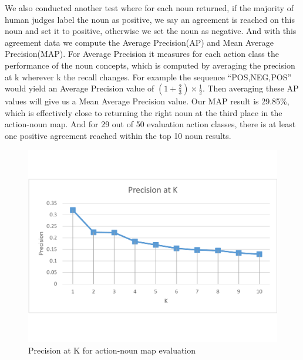 We also conducted another test where for each noun returned, if the majority of human judges label the noun
as positive, we say an agreement is reached on this noun and set it to positive, otherwise we set the noun as negative.
And with this agreement data we compute the Average Precision(AP) and Mean Average Precision(MAP). For Average Precision
it measures for each action class the performance of the noun concepts, which is computed by averaging the precision at k
wherever k the recall changes. For example the sequence ``POS,NEG,POS'' would yield an Average Precision value of
$(1 + \frac{2}{3})\times\frac{1}{2}$. Then averaging these AP values will give us a Mean Average Precision value. Our MAP result is 29.85\%,
which is effectively close to returning the right noun at the third place in the action-noun map. And for 29 out of 50 evaluation action classes,
there is at least one positive agreement reached within the top 10 noun results.
\begin{figure}[!htp]
 \centering
 \includegraphics[width=\linewidth]{img/patk.pdf}
 \caption{Precision at K for action-noun map evaluation}
\end{figure}

